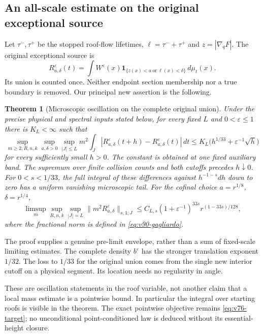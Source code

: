 \documentclass[11pt,reqno]{amsart}
\numberwithin{equation}{section}
\newtheorem{theorem}{Theorem}[section]
\theoremstyle{definition}
\theoremstyle{remark}\newtheorem{remark}[theorem]{Remark}
\newcommand{\one}{\mathbf1}\newcommand{\dd}{\,\mathrm d}
\begin{document}
\subsection{An all-scale estimate on the original exceptional source}
Let $\tau^-,\tau^+$ be the stopped roof-flow lifetimes, $\ell=\tau^-+\tau^+$
and $z=|\nabla_qF|$. The original exceptional source is
\[
 R_{a,\delta}^\varepsilon(t)
   =\int W^\varepsilon(x)\one_{\{z(x)<a\ \mathrm{or}\ \ell(x)<\delta\}}
                                                       \,d\mu_t(x).
\]
Its union is counted once. Neither endpoint section membership nor a
true boundary is removed. Our principal new assertion is the following.
\begin{theorem}[Microscopic oscillation on the complete original union]
\label{thm:v90-main}
Under the precise physical and spectral inputs stated below, for every
fixed $L$ and $0<\varepsilon\le1$ there is $K_L<\infty$ such that
\[
 \sup_{m\ge2,R,n,k}\sup_{a,\delta>0}\sup_{|J|\le L}m^2
 \int_J|R_{a,\delta}^\varepsilon(t+h)-R_{a,\delta}^\varepsilon(t)|\,dt
       \le K_L\bigl(h^{1/33}+\varepsilon^{-1}\sqrt h\bigr)
\]
for every sufficiently small $h>0$. The constant is obtained at one
fixed auxiliary band. The supremum over finite collision counts and
both cutoffs precedes $h\downarrow0$.
For $0<s<1/33$, the full integral of these differences against
$h^{-1-s}dh$ down to zero has a uniform vanishing microscopic tail.
For the cofinal choice $a=r^{1/8}$, $\delta=r^{1/4}$,
\[
 \limsup_m\sup_{R,n,k}\sup_{|J|=L}
 \|m^2R_{a,\delta}^\varepsilon\|_{s,1;J}
             \le C_{L,s}(1+\varepsilon^{-1})^{33s}r^{(1-33s)/128},
\]
where the fractional norm is defined in \eqref{eq:v90-gagliardo}.
\end{theorem}
The proof supplies a genuine pre-limit envelope, rather than a sum of
fixed-scale limiting estimates. The complete density $b^\varepsilon$
has the stronger translation exponent $1/32$. The loss to $1/33$ for
the original union comes from the single new interior cutoff on a
physical segment. Its location needs no regularity in angle.

These are oscillation statements in the roof variable, not another
claim that a local mass estimate is a pointwise bound. In particular the
integral over starting roofs is visible in the theorem. The exact
pointwise objective remains \eqref{eq:v76-target}; no unconditional
point-conditioned law is deduced without its essential-height closure.





\end{document}
